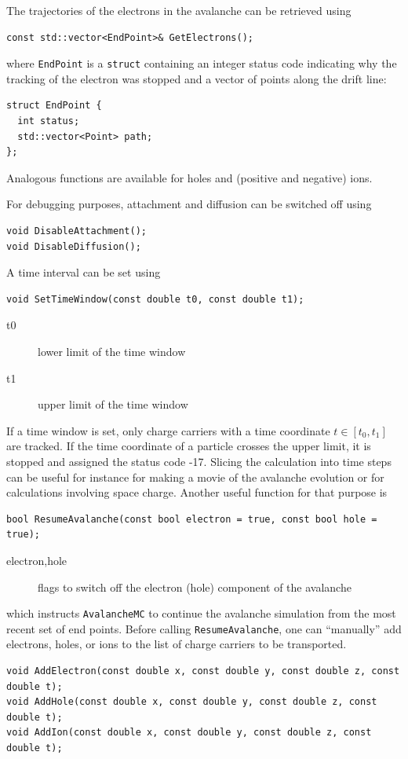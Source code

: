The trajectories of the electrons in the avalanche can be 
retrieved using
\begin{lstlisting}
const std::vector<EndPoint>& GetElectrons();
\end{lstlisting}
where \texttt{EndPoint} is a \texttt{struct} containing an integer status code indicating why the tracking of the electron was stopped and a vector of points along the drift line:
\begin{lstlisting}
struct EndPoint {
  int status;
  std::vector<Point> path;
};
\end{lstlisting}  
Analogous functions are available for holes and (positive and negative) ions.

For debugging purposes, attachment and diffusion can be switched off using
\begin{lstlisting}
void DisableAttachment();
void DisableDiffusion();
\end{lstlisting}

A time interval can be set using
\begin{lstlisting}
void SetTimeWindow(const double t0, const double t1);
\end{lstlisting}
\begin{description}
  \item[t0] lower limit of the time window
  \item[t1] upper limit of the time window 
\end{description}
If a time window is set, 
only charge carriers with a time coordinate \(t \in \left[t_{0}, t_{1}\right]\) 
are tracked. If the time coordinate of a particle crosses the upper limit, 
it is stopped and assigned the status code -17.
Slicing the calculation into time steps can be useful for instance 
for making a movie of the avalanche evolution 
or for calculations involving space charge. 
Another useful function for that purpose is
\begin{lstlisting}
bool ResumeAvalanche(const bool electron = true, const bool hole = true);
\end{lstlisting}
\begin{description}
  \item[electron,hole] flags to switch off the electron (hole) component of the avalanche
\end{description}
which instructs \texttt{AvalancheMC} to continue the avalanche simulation 
from the most recent set of end points.
Before calling \texttt{ResumeAvalanche}, one can ``manually'' add 
electrons, holes, or ions to the list of charge carriers to be transported. 
\begin{lstlisting}
void AddElectron(const double x, const double y, const double z, const double t); 
void AddHole(const double x, const double y, const double z, const double t); 
void AddIon(const double x, const double y, const double z, const double t); 
\end{lstlisting} 

